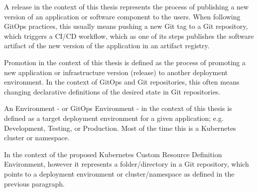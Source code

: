 
A release in the context of this thesis
represents the process of
publishing a new version of an application or software component
to the users.
When following GitOps practices,
this usually means
pushing a new Git tag to a Git repository,
which triggers a CI/CD workflow,
which as one of its steps publishes the software artifact of
the new version of the application in an artifact registry.


Promotion in the context of this thesis is defined as
the process of promoting a new application or infrastructure version (release)
to another deployment environment.
In the context of GitOps and Git repositories,
this often means changing declarative definitions of the desired state in Git repositories.


An Environment
- or GitOps Environment -
in the context of this thesis
is defined as a target deployment environment for a given application;
e.g. Development, Testing, or Production.
Most of the time this is a Kubernetes cluster or namespace.

In the context of the proposed Kubernetes Custom Resource Definition
Environment, however it represents a folder/directory in a Git repository,
which points to a deployment environment or cluster/namespace as defined
in the previous paragraph.







%
%





